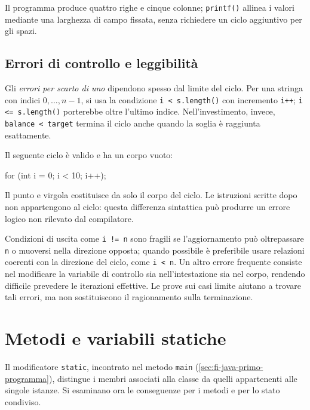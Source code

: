 

Il programma produce quattro righe e cinque colonne;
\texttt{printf()} allinea i valori mediante una larghezza di campo
fissata, senza richiedere un ciclo aggiuntivo per gli spazi.

\subsection{Errori di controllo e leggibilità}
\label{sec:fi-java-cicli-errori}

Gli \emph{errori per scarto di uno} dipendono spesso
dal limite del ciclo. Per una stringa con indici
\(0,\ldots,n-1\), si usa la condizione
\texttt{i < s.length()} con incremento \texttt{i++};
\texttt{i <= s.length()} porterebbe oltre l'ultimo indice.
Nell'investimento, invece, \texttt{balance < target}
termina il ciclo anche quando la soglia è raggiunta esattamente.

Il seguente ciclo è valido e ha un corpo vuoto:
\begin{unipdcode}[language=Java]
for (int i = 0; i < 10; i++);
\end{unipdcode}
\begin{warning}
Il punto e virgola costituisce da solo il corpo del ciclo.
Le istruzioni scritte dopo non appartengono al ciclo: questa
differenza sintattica può produrre un errore logico non rilevato
dal compilatore.
\end{warning}

Condizioni di uscita come \texttt{i != n} sono fragili se
l'aggiornamento può oltrepassare \texttt{n} o muoversi nella
direzione opposta; quando possibile è preferibile usare
relazioni coerenti con la direzione del ciclo, come
\texttt{i < n}. Un altro errore frequente consiste nel modificare
la variabile di controllo sia nell'intestazione sia nel corpo,
rendendo difficile prevedere le iterazioni effettive.
Le prove sui casi limite aiutano a trovare tali errori, ma
non sostituiscono il ragionamento sulla terminazione.

\clearpage

\section{Metodi e variabili statiche}
\label{sec:fi-java-cicli-static}

Il modificatore \texttt{static}, incontrato nel metodo
\texttt{main} (\cref{sec:fi-java-primo-programma}), distingue
i membri associati alla classe da quelli appartenenti alle
singole istanze. Si esaminano ora le conseguenze per i metodi
e per lo stato condiviso.


